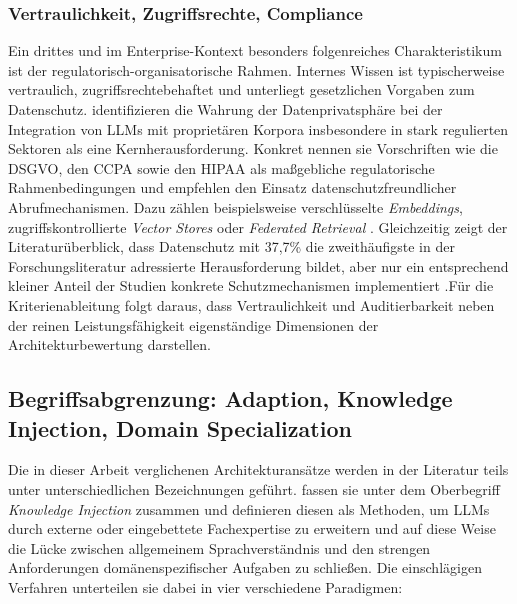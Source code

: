 \subsubsection{Vertraulichkeit, Zugriffsrechte, Compliance}
\label{sec:compliance}

Ein drittes und im Enterprise-Kontext besonders folgenreiches Charakteristikum ist der regulatorisch-or\-ga\-ni\-sa\-to\-ri\-sche Rahmen. Internes Wissen ist typischerweise vertraulich, zugriffsrechtebehaftet und unterliegt gesetzlichen Vorgaben zum Datenschutz. \textcite[2]{Karakurt.2026} identifizieren die Wahrung der Datenprivatsphäre bei der Integration von LLMs mit proprietären Korpora insbesondere in stark regulierten Sektoren als eine Kernherausforderung. Konkret nennen sie Vorschriften wie die DSGVO, den CCPA sowie den HIPAA als maßgebliche regulatorische Rahmenbedingungen und empfehlen den Einsatz datenschutzfreundlicher Abrufmechanismen. Dazu zählen beispielsweise verschlüsselte \textit{Embeddings}, zugriffskontrollierte \textit{Vector Stores} oder \textit{Federated Retrieval} \autocite[20]{Karakurt.2026}. Gleichzeitig zeigt der Literaturüberblick, dass Datenschutz mit 37{,}7\% die zweithäufigste in der Forschungsliteratur adressierte Herausforderung bildet, aber nur ein entsprechend kleiner Anteil der Studien konkrete Schutzmechanismen implementiert \autocite[20,22]{Karakurt.2026}.\newpage Für die Kriterienableitung folgt daraus, dass Vertraulichkeit und Auditierbarkeit neben der reinen Leistungsfähigkeit eigenständige Dimensionen der Architekturbewertung darstellen.

\subsection{Begriffsabgrenzung: Adaption, Knowledge Injection, Domain Specialization}
\label{sec:begriffsabgrenzung}

Die in dieser Arbeit verglichenen Architekturansätze werden in der Literatur teils unter unterschiedlichen Bezeichnungen geführt. \textcite[1]{Song.2025} fassen sie unter dem Oberbegriff \textit{Knowledge Injection} zusammen und definieren diesen als Methoden, um LLMs durch externe oder eingebettete Fachexpertise zu erweitern und auf diese Weise die Lücke zwischen allgemeinem Sprachverständnis und den strengen Anforderungen domänenspezifischer Aufgaben zu schließen. Die einschlägigen Verfahren unterteilen sie dabei in vier verschiedene Paradigmen:

